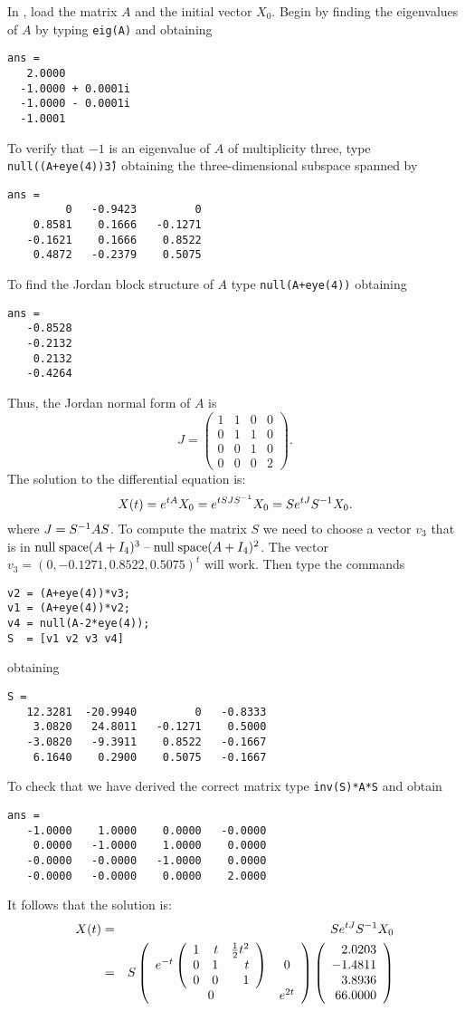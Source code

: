 \soln  In \Matlabp, load the matrix $A$ and the
initial vector $X_0$.  Begin by finding the eigenvalues of $A$ by typing 
{\tt eig(A)} and obtaining
\begin{verbatim}
ans =
   2.0000          
  -1.0000 + 0.0001i
  -1.0000 - 0.0001i
  -1.0001   
\end{verbatim}
To verify that $-1$ is an eigenvalue of $A$ of multiplicity three, type
{\tt null((A+eye(4))\^3)} obtaining the three-dimensional subspace spanned by
\begin{verbatim}
ans =
         0   -0.9423         0
    0.8581    0.1666   -0.1271
   -0.1621    0.1666    0.8522
    0.4872   -0.2379    0.5075
\end{verbatim}
To find the Jordan block structure of $A$ type {\tt null(A+eye(4))} obtaining
\begin{verbatim}
ans =
   -0.8528
   -0.2132
    0.2132
   -0.4264
\end{verbatim}
Thus, the Jordan normal form of $A$ is 
\[
J = \left(\begin{array}{rrrr} 1 & 1 & 0 & 0\\ 0 & 1 & 1 & 0\\ 0 & 0 & 1 & 0\\
0 & 0 & 0 & 2 \end{array}\right).
\]
The solution to the differential equation is:
\[
X(t) = e^{tA}X_0 = e^{tSJS^{-1}}X_0= Se^{tJ}S^{-1} X_0.
\]
where $J=S^{-1} AS$.  To compute the matrix $S$ we need to choose a vector 
$v_3$ that is in ${\rm null\;space}(A+I_4)^3\;\mbox{--}\;{\rm null\;space}(A+I_4)^2$.  The vector 
$v_3 = (0, -0.1271, 0.8522, 0.5075)^t$ will work. Then type the commands
\begin{verbatim}
v2 = (A+eye(4))*v3;
v1 = (A+eye(4))*v2;
v4 = null(A-2*eye(4));
S  = [v1 v2 v3 v4]
\end{verbatim}
obtaining
\begin{verbatim}
S =
   12.3281  -20.9940         0   -0.8333
    3.0820   24.8011   -0.1271    0.5000
   -3.0820   -9.3911    0.8522   -0.1667
    6.1640    0.2900    0.5075   -0.1667
\end{verbatim}
To check that we have derived the correct matrix type {\tt inv(S)*A*S}
and obtain
\begin{verbatim}
ans =
   -1.0000    1.0000    0.0000   -0.0000
    0.0000   -1.0000    1.0000    0.0000
   -0.0000   -0.0000   -1.0000    0.0000
   -0.0000   -0.0000    0.0000    2.0000
\end{verbatim}
It follows that the solution is:
\begin{eqnarray*}
X(t) & = & Se^{tJ}S^{-1} X_0 \\ & = & 
S\left(\begin{array}{cc} e^{-t}\left(\begin{array}{rrr}
     1  &  t   &   \frac{1}{2}t^2\\
    0   &  1   &   t\\
    0   &  0   &   1 \end{array}\right) & 0\\ 0 &e^{2t}\end{array}\right)
\left(\begin{array}{r} 2.0203\\ -1.4811 \\ 3.8936\\ 66.0000 \end{array}\right)
\end{eqnarray*}
